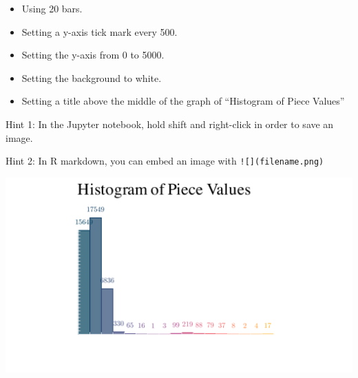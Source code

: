 \documentclass[
]{article}
\providecommand{\tightlist}{%
  \setlength{\itemsep}{0pt}\setlength{\parskip}{0pt}}
\begin{document}
\begin{itemize}
\tightlist
\item
  Using 20 bars.
\item
  Setting a y-axis tick mark every 500.
\item
  Setting the y-axis from 0 to 5000.
\item
  Setting the background to white.
\item
  Setting a title above the middle of the graph of ``Histogram of Piece
  Values''
\end{itemize}

Hint 1: In the Jupyter notebook, hold shift and right-click in order to
save an image.

Hint 2: In R markdown, you can embed an image with
\texttt{!{[}{]}(filename.png)}

\includegraphics{Histogram_of_Piece_remove.png}
\end{document}

